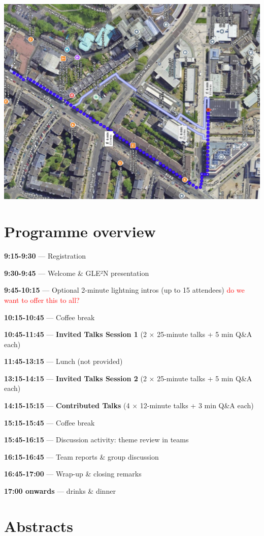 \documentclass[
  11pt,
  letterpaper,
  DIV=11,
  numbers=noendperiod]{scrartcl}
\begin{document}
\begin{center}
\includegraphics[width=0.6\linewidth]{map-to-ms.png}
\end{center}

\newpage

\hypertarget{programme-overview}{%
\section{Programme overview}\label{programme-overview}}

\textbf{9:15-9:30} --- Registration

\textbf{9:30-9:45} --- Welcome \& GLE²N presentation

\textbf{9:45-10:15} --- Optional 2-minute lightning intros (up to 15
attendees) \textcolor{red}{do we want to offer this to all?}

\textbf{10:15-10:45} --- Coffee break

\textbf{10:45-11:45} --- \textbf{Invited Talks Session 1} (2 × 25-minute
talks + 5 min Q\&A each)

\textbf{11:45-13:15} --- Lunch (not provided)

\textbf{13:15-14:15} --- \textbf{Invited Talks Session 2} (2 × 25-minute
talks + 5 min Q\&A each)

\textbf{14:15-15:15} --- \textbf{Contributed Talks} (4 × 12-minute talks
+ 3 min Q\&A each)

\textbf{15:15-15:45} --- Coffee break

\textbf{15:45-16:15} --- Discussion activity: theme review in teams

\textbf{16:15-16:45} --- Team reports \& group discussion

\textbf{16:45-17:00} --- Wrap-up \& closing remarks

\textbf{17:00 onwards} --- drinks \& dinner

\newpage

\hypertarget{abstracts}{%
\section{Abstracts}\label{abstracts}}
\end{document}
